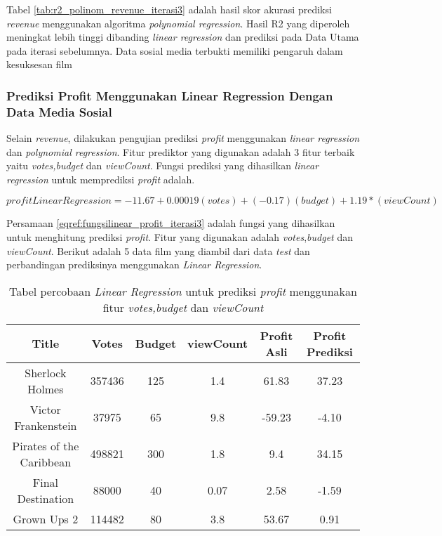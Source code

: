 Tabel \ref{tab:r2_polinom_revenue_iterasi3} adalah hasil skor akurasi prediksi \textit{revenue} menggunakan algoritma \textit{polynomial regression}. Hasil R2 yang diperoleh meningkat lebih tinggi dibanding \textit{linear regression} dan prediksi pada Data Utama pada iterasi sebelumnya. Data sosial media terbukti memiliki pengaruh dalam kesuksesan film 


\subsubsection{Prediksi Profit Menggunakan Linear Regression Dengan Data Media Sosial}
 
Selain \textit{revenue}, dilakukan pengujian prediksi \textit{profit} menggunakan \textit{linear regression} dan \textit{polynomial regression}. Fitur prediktor yang digunakan adalah 3 fitur terbaik yaitu \textit{votes,budget} dan \textit{viewCount}. Fungsi prediksi yang dihasilkan \textit{linear regression} untuk memprediksi \textit{profit} adalah. 


\begin{equation}
profitLinearRegression = -11.67 + 0.00019 (votes) + (-0.17)(budget) + 1.19 * (viewCount) 
\label{eqref:fungsilinear_profit_iterasi3}
\end{equation}

Persamaan \ref{eqref:fungsilinear_profit_iterasi3} adalah fungsi yang dihasilkan untuk menghitung prediksi \textit{profit}. Fitur yang digunakan adalah \textit{votes},\textit{budget} dan \textit{viewCount}. Berikut adalah 5 data film yang diambil dari data \textit{test} dan perbandingan prediksinya menggunakan \textit{Linear Regression}.

\begin{table}[H]
\caption{Tabel percobaan \textit{Linear Regression} untuk prediksi \textit{profit} menggunakan fitur \textit{votes,budget} dan \textit{viewCount}} 
\centering
\begin{tabular}{|c|c|c|c|c|c|}
\hline 
Title & Votes & Budget & viewCount & Profit Asli  & Profit Prediksi \\ 
\hline 
Sherlock Holmes & 357436 & 125 & 1.4 & 61.83 & 37.23 \\ 
\hline 
Victor Frankenstein & 37975 & 65 & 9.8 & -59.23 & -4.10 \\ 
\hline 
Pirates of the Caribbean & 498821 & 300 & 1.8 & 9.4 & 34.15 \\ 
\hline 
Final Destination & 88000 & 40 & 0.07 & 2.58 & -1.59 \\ 
\hline 
Grown Ups 2 & 114482 & 80 & 3.8 & 53.67 & 0.91 \\ 
\hline 
\end{tabular} 
\label{tab:5sampel_prediksiprofit_linear_iterasi3}
\end{table}

